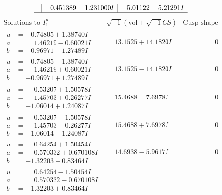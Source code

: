 \documentclass[1p]{elsarticle_modified}
\theoremstyle{definition}
\newcommand{\I}{\sqrt{-1}}
\begin{document}
$$\begin{array}{c|c|c}
 & -0.451389 - 1.231000 I & -5.01122 + 5.21291 I\\
 \hline 
 \end{array}$$\newpage$$\begin{array}{c|c|c}  
\text{Solutions to }I^u_{1}& \I (\text{vol} + \sqrt{-1}CS) & \text{Cusp shape}\\
 \hline 
\begin{aligned}
u &= -0.74805 + 1.38740 I \\
a &= \phantom{-}1.46219 - 0.60021 I \\
b &= -0.96971 - 1.27489 I\end{aligned}
 & \phantom{-}13.1525 + 14.1820 I & \phantom{-0.000000 } 0 \\ \hline\begin{aligned}
u &= -0.74805 - 1.38740 I \\
a &= \phantom{-}1.46219 + 0.60021 I \\
b &= -0.96971 + 1.27489 I\end{aligned}
 & \phantom{-}13.1525 - 14.1820 I & \phantom{-0.000000 } 0 \\ \hline\begin{aligned}
u &= \phantom{-}0.53207 + 1.50578 I \\
a &= \phantom{-}1.45703 + 0.26277 I \\
b &= -1.06014 + 1.24087 I\end{aligned}
 & \phantom{-}15.4688 - 7.6978 I & \phantom{-0.000000 } 0 \\ \hline\begin{aligned}
u &= \phantom{-}0.53207 - 1.50578 I \\
a &= \phantom{-}1.45703 - 0.26277 I \\
b &= -1.06014 - 1.24087 I\end{aligned}
 & \phantom{-}15.4688 + 7.6978 I & \phantom{-0.000000 } 0 \\ \hline\begin{aligned}
u &= \phantom{-}0.64254 + 1.50454 I \\
a &= \phantom{-}0.570332 + 0.670108 I \\
b &= -1.32203 - 0.83464 I\end{aligned}
 & \phantom{-}14.6938 - 5.9617 I & \phantom{-0.000000 } 0 \\ \hline\begin{aligned}
u &= \phantom{-}0.64254 - 1.50454 I \\
a &= \phantom{-}0.570332 - 0.670108 I \\
b &= -1.32203 + 0.83464 I\end{aligned}

\end{array}$$
\end{document}

